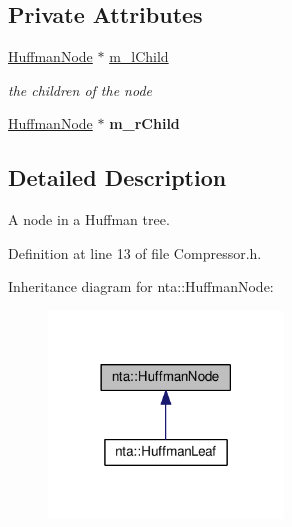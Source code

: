 \subsection*{Private Attributes}
\begin{DoxyCompactItemize}
\item 
\mbox{\label{classnta_1_1HuffmanNode_ae8cdbf035355dfbe64bdba9b2b29a589}} 
\hyperlink{classnta_1_1HuffmanNode}{Huffman\+Node} $\ast$ \hyperlink{classnta_1_1HuffmanNode_ae8cdbf035355dfbe64bdba9b2b29a589}{m\+\_\+l\+Child}
\begin{DoxyCompactList}\small\item\em the children of the node \end{DoxyCompactList}\item 
\mbox{\label{classnta_1_1HuffmanNode_adfc2e8ad6db0b3a46d7187a7c839d350}} 
\hyperlink{classnta_1_1HuffmanNode}{Huffman\+Node} $\ast$ {\bfseries m\+\_\+r\+Child}
\end{DoxyCompactItemize}


\subsection{Detailed Description}
A node in a Huffman tree. 

Definition at line 13 of file Compressor.\+h.



Inheritance diagram for nta\+:\+:Huffman\+Node\+:
\nopagebreak
\begin{figure}[H]
\begin{center}
\leavevmode
\includegraphics[width=177pt]{d4/d0d/classnta_1_1HuffmanNode__inherit__graph}
\end{center}
\end{figure}


